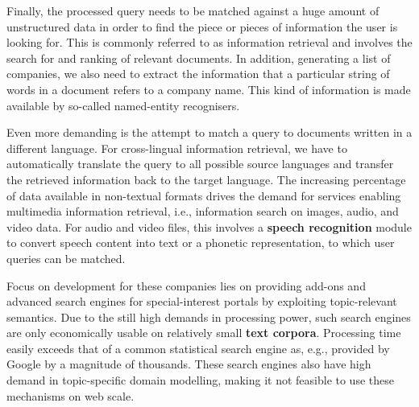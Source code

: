 \begin{multicols}{2}

Finally, the processed query needs to be matched against a huge amount of unstructured data in order to find the piece or pieces of information the user is looking for. This is commonly referred to as 
information retrieval and involves the search for and ranking of relevant documents. In addition, generating a list of companies, we also need to extract the information that a particular string of words in a document refers to a company name. This kind of information is made available by so-called 
named-entity recognisers. 

Even more demanding is the attempt to match a query to documents written in a different language. For 
cross-lingual information retrieval, we have to automatically translate the query to all possible source languages and transfer the retrieved information back to the target language. The increasing percentage of data available in non-textual formats drives the demand for services enabling 
multimedia information retrieval, i.e., information search on images, audio, and video data. For audio and video files, this involves a \textbf{speech recognition} module to convert speech content into text or a phonetic representation, to which user queries can be matched.

Focus on development for these companies lies on providing add-ons and advanced search engines for special-interest portals by exploiting topic-relevant semantics. Due to the still high demands in processing power, such search engines are only economically usable on relatively small \textbf{text corpora}. Processing time easily exceeds that of a common statistical search engine as, e.g., provided by Google by a magnitude of thousands. These search engines also have high demand in topic-specific domain modelling, making it not feasible to use these mechanisms on web scale.


\end{multicols}
